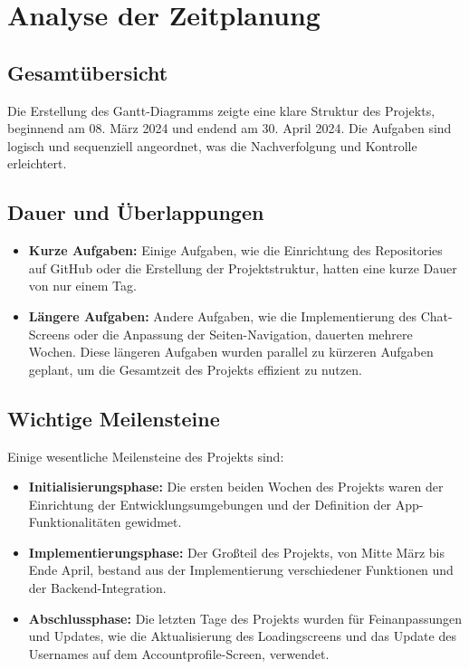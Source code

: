 \section{Analyse der Zeitplanung}
\subsection{Gesamtübersicht}
Die Erstellung des Gantt-Diagramms zeigte eine klare Struktur des Projekts, beginnend am 08. März 2024 und endend am 30. April 2024. Die Aufgaben sind logisch und sequenziell angeordnet, was die Nachverfolgung und Kontrolle erleichtert.

\subsection{Dauer und Überlappungen}
\begin{itemize}
    \item \textbf{Kurze Aufgaben:} Einige Aufgaben, wie die Einrichtung des Repositories auf GitHub oder die Erstellung der Projektstruktur, hatten eine kurze Dauer von nur einem Tag.
    \item \textbf{Längere Aufgaben:} Andere Aufgaben, wie die Implementierung des Chat-Screens oder die Anpassung der Seiten-Navigation, dauerten mehrere Wochen. Diese längeren Aufgaben wurden parallel zu kürzeren Aufgaben geplant, um die Gesamtzeit des Projekts effizient zu nutzen.
\end{itemize}

\subsection{Wichtige Meilensteine}
Einige wesentliche Meilensteine des Projekts sind:
\begin{itemize}
    \item \textbf{Initialisierungsphase:} Die ersten beiden Wochen des Projekts waren der Einrichtung der Entwicklungsumgebungen und der Definition der App-Funktionalitäten gewidmet.
    \item \textbf{Implementierungsphase:} Der Großteil des Projekts, von Mitte März bis Ende April, bestand aus der Implementierung verschiedener Funktionen und der Backend-Integration.
    \item \textbf{Abschlussphase:} Die letzten Tage des Projekts wurden für Feinanpassungen und Updates, wie die Aktualisierung des Loadingscreens und das Update des Usernames auf dem Accountprofile-Screen, verwendet.
\end{itemize}

